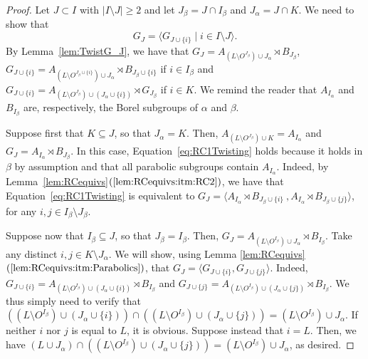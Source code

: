 \documentclass[11pt,letterpaper]{amsart}
\begin{document}
\begin{proof}
    Let $J \subset I$ with $|I \setminus J| \geq 2$ and let $J_\beta = J \cap I_\beta$ and $J_\alpha = J \cap K$. We need to show that 
    \begin{equation}\label{eq:RC1Twisting}
          G_J = \langle G_{J \cup \{i\}}\mid i \in I \setminus J \rangle.
    \end{equation}
   By Lemma~\ref{lem:TwistG_J}, we have that $G_J = A_{(L\setminus O^{J_\beta}) \cup J_\alpha}\rtimes B_{J_\beta}$, $G_{J \cup \{i\}} = A_{(L\setminus O^{J_\beta \cup \{i\}}) \cup J_\alpha}\rtimes B_{J_\beta \cup \{i\}}$ if $i \in I_\beta$ and $G_{J \cup \{i\}} = A_{(L\setminus O^{J_\beta}) \cup (J_\alpha \cup \{i\})}\rtimes G_{J_\beta}$ if $i \in K$. 
   We remind the reader that $A_{I_\alpha}$ and $B_{I_\beta}$ are, respectively, the Borel subgroups of $\alpha$ and $\beta$.

    Suppose first that $K \subseteq J$, so that $J_\alpha = K$. Then, $A_{(L \setminus O^{J_\beta}) \cup K} = A_{I_\alpha}$ and $G_J = A_{I_\alpha} \rtimes B_{J_\beta}$. In this case, Equation~\ref{eq:RC1Twisting} holds because it holds in $\beta$ by assumption and that all parabolic subgroups contain $A_{I_\alpha}$. Indeed, by Lemma~\ref{lem:RCequivs}$(\ref{lem:RCequivs:itm:RC2})$, we have that Equation~\ref{eq:RC1Twisting} is equivalent to $G_J = \langle A_{I_\alpha} \rtimes B_{J_\beta \cup \{i\}}\ , A_{I_\alpha} \rtimes B_{J_\beta \cup \{j\}} \rangle$, for any $i,j \in I_\beta \setminus J_\beta$.
 
 Suppose now that $I_\beta \subseteq J$, so that $J_\beta = I_\beta$. Then, $G_J = A_{(L \setminus O^{I_\beta}) \cup J_\alpha} \rtimes B_{I_\beta}$. Take any distinct $i,j \in K \setminus J_\alpha$. We will show, using Lemma \ref{lem:RCequivs}$(\ref{lem:RCequivs:itm:Parabolics})$, that $G_J = \langle G_{J \cup \{i\}}, G_{J \cup \{j\}} \rangle$. 
 Indeed, $G_{J \cup \{i\}} = A_{(L\setminus O^{I_\beta}) \cup (J_\alpha \cup \{i\})}\rtimes B_{I_\beta}$ and $G_{J \cup \{j\}} = A_{(L\setminus O^{I_\beta}) \cup (J_\alpha \cup \{j\})}\rtimes B_{I_\beta}$.
 We thus simply need to verify that $((L\setminus O^{I_\beta}) \cup (J_\alpha \cup \{i\})) \cap ((L\setminus O^{I_\beta}) \cup (J_\alpha \cup \{j\})) = (L \setminus O^{I_\beta}) \cup J_\alpha$. If neither $i$ nor $j$ is equal to $L$, it is obvious. Suppose instead that $i = L$. Then, we have $(L \cup J_\alpha) \cap ((L\setminus O^{I_\beta}) \cup (J_\alpha \cup \{j\})) = (L \setminus O^{I_\beta}) \cup J_\alpha$, as desired.


\end{proof}
\end{document}
